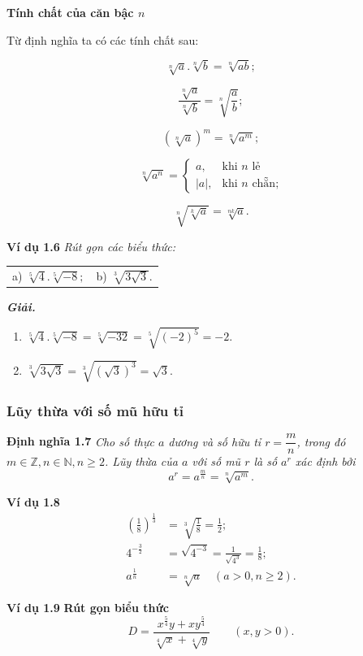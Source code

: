 \documentclass{article}
\begin{document}
\textbf{\color{blue}Tính chất của căn bậc $n$}

Từ định nghĩa ta có các tính chất sau:

\[
\sqrt[n]{a} . \sqrt[n]{b} = \sqrt[n]{ab};
\]

\[
\frac{\sqrt[n]{a}}{\sqrt[n]{b}} = \sqrt[n]{\frac{a}{b}};
\]

\[
(\sqrt[n]{a})^m = \sqrt[n]{a^m};
\]

\[
\sqrt[n]{a^n} = \begin{cases} 
a, & \text{khi } n \text{ lẻ} \\[5pt]
|a|, & \text{khi } n \text{ chẵn;} 
\end{cases}
\]

\[
\sqrt[n]{\sqrt[k]{a}} = \sqrt[nk]{a}.
\]

\textbf{Ví dụ 1.6} \textit{Rút gọn các biểu thức:}

\begin{tabular}{@{}p{} p{}@{}}
a) $\sqrt[5]{4} . \sqrt[5]{-8};$ & b) $\sqrt[3]{3\sqrt{3}}.$
\end{tabular}

\textbf{\color{blue}\textit{Giải.}}

\begin{enumerate}
    \item $\sqrt[5]{4} . \sqrt[5]{-8} = \sqrt[5]{-32} = \sqrt[5]{(-2)^5} = -2.$
    \item $\sqrt[3]{3\sqrt{3}} = \sqrt[3]{(\sqrt{3})^3} = \sqrt{3}.$
\end{enumerate}

\subsubsection{Lũy thừa với số mũ hữu tỉ}
\textbf{Định nghĩa 1.7} \textit{Cho số thực $a$ dương và số hữu tỉ $r = \dfrac{m}{n}$, trong đó $m \in \mathbb{Z}, n \in \mathbb{N}, n \ge 2$. Lũy thừa của $a$ với số mũ $r$ là số $a^r$ xác định bởi}
\[
a^r = a^{\frac{m}{n}} = \sqrt[n]{a^m}.
\]

\textbf{Ví dụ 1.8}
\[
\begin{aligned}
\left(\frac{1}{8}\right)^{\frac{1}{3}} &= \sqrt[3]{\frac{1}{8}} = \frac{1}{2}; \\[8pt]
4^{-\frac{3}{2}} &= \sqrt{4^{-3}} = \frac{1}{\sqrt{4^3}} = \frac{1}{8}; \\[8pt]
a^{\frac{1}{n}} &= \sqrt[n]{a} \quad (a > 0, n \ge 2).
\end{aligned}
\]

\textbf{Ví dụ 1.9} \textbf{Rút gọn biểu thức}
\[
D = \frac{x^{\frac{5}{4}}y + xy^{\frac{5}{4}}}{\sqrt[4]{x} + \sqrt[4]{y}} \qquad (x, y > 0).
\]
\end{document}
